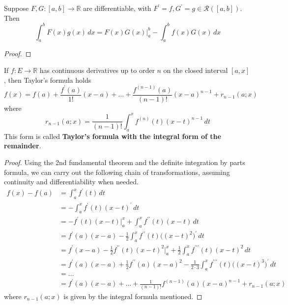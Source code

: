  \begin{theorem}
    Suppose $F, G: [a, b] \to \mathbb{R}$ are differentiable, with $F^\prime = f, G^\prime = g \in \mathcal{R}([a, b])$. Then 
    \begin{equation}
      \int_a^b F(x) g(x) \,dx = F(x) G(x) \big|_a^b - \int_a^b f(x) G(x) \,dx 
    \end{equation}
  \end{theorem} 
  \begin{proof}
    
  \end{proof}

  \begin{theorem}
    If $f: E \longrightarrow \mathbb{R}$ has continuous derivatives up to order $n$ on the closed interval $[a, x]$, then Taylor's formula holds
    \begin{equation}
      f(x) = f(a) + \frac{f^\prime (a)}{1!} (x - a) + \ldots + \frac{f^{(n-1)}(a)}{(n-1)!} (x - a)^{n-1} + r_{n-1}(a; x)
    \end{equation}
    where 
    \begin{equation}
      r_{n-1} (a;x) = \frac{1}{(n-1)!} \int_a^x f^{(n)} (t) (x - t)^{n-1} \,dt
    \end{equation}
    This form is called \textbf{Taylor's formula with the integral form of the remainder}. 
  \end{theorem}
  \begin{proof}
    Using the 2nd fundamental theorem and the definite integration by parts formula, we can carry out the following chain of transformations, assuming continuity and differentiability when needed. 
    \begin{align*}
      f(x) - f(a) & = \int_a^x f^\prime (t) \,dt \\
      & = - \int_a^x f^\prime(t) (x - t)^\prime \,dt \\
      & = -f^\prime (t) (x - t)\big|_a^x + \int_a^x f^{\prime\prime} (t) (x - t) \,dt \\
      & = f^\prime (a) (x - a) - \frac{1}{2} \int_a^x f^{\prime\prime} (t) \big( (x - t)^2\big)^\prime \,dt \\
      & = f^\prime (x - a) - \frac{1}{2} f^{\prime\prime} (t) (x - t)^2 \big|_a^x + \frac{1}{2} \int_a^x f^{\prime\prime\prime} (t) (x - t)^2\,dt \\
      & = f^\prime(a) (x - a) + \frac{1}{2} f^{\prime\prime} (a) (x - a)^2 - \frac{1}{2 \cdot 3} \int_a^x f^{\prime\prime\prime} (t) \big((x - t)^3\big)^\prime\,dt \\
      & = \ldots \\
      & = f^\prime (a) (x - a) + \ldots + \frac{1}{(n-1)!} f^{(n-1)} (a)(x - a)^{n-1} + r_{n-1}(a;x)
    \end{align*}
    where $r_{n-1}(a;x)$ is given by the integral formula mentioned. 
  \end{proof}

